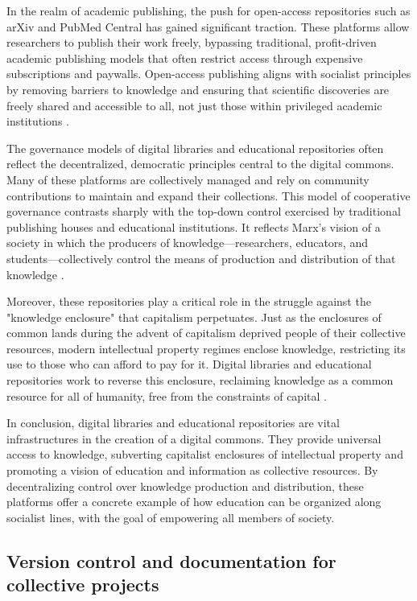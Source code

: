 \begin{refsection}
In the realm of academic publishing, the push for open-access repositories such as arXiv and PubMed Central has gained significant traction. These platforms allow researchers to publish their work freely, bypassing traditional, profit-driven academic publishing models that often restrict access through expensive subscriptions and paywalls. Open-access publishing aligns with socialist principles by removing barriers to knowledge and ensuring that scientific discoveries are freely shared and accessible to all, not just those within privileged academic institutions \cite[pp.~157-159]{suber2012}.

The governance models of digital libraries and educational repositories often reflect the decentralized, democratic principles central to the digital commons. Many of these platforms are collectively managed and rely on community contributions to maintain and expand their collections. This model of cooperative governance contrasts sharply with the top-down control exercised by traditional publishing houses and educational institutions. It reflects Marx’s vision of a society in which the producers of knowledge—researchers, educators, and students—collectively control the means of production and distribution of that knowledge \cite[pp.~234-235]{bauwens2005}.

Moreover, these repositories play a critical role in the struggle against the "knowledge enclosure" that capitalism perpetuates. Just as the enclosures of common lands during the advent of capitalism deprived people of their collective resources, modern intellectual property regimes enclose knowledge, restricting its use to those who can afford to pay for it. Digital libraries and educational repositories work to reverse this enclosure, reclaiming knowledge as a common resource for all of humanity, free from the constraints of capital \cite[pp.~56-58]{lessig2004}.

In conclusion, digital libraries and educational repositories are vital infrastructures in the creation of a digital commons. They provide universal access to knowledge, subverting capitalist enclosures of intellectual property and promoting a vision of education and information as collective resources. By decentralizing control over knowledge production and distribution, these platforms offer a concrete example of how education can be organized along socialist lines, with the goal of empowering all members of society.

\subsection{Version control and documentation for collective projects}


\end{refsection}
